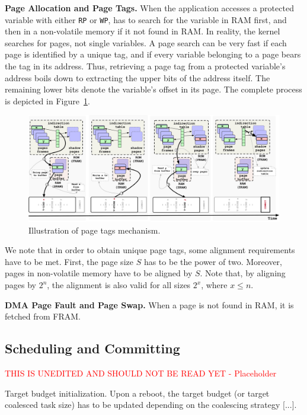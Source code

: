 \noindent \textbf{Page Allocation and Page Tags.} When the \sys application accesses a protected variable with either \texttt{RP} or \texttt{WP}, \sys has to search for the variable in RAM first, and then in a non-volatile memory if it not found in RAM. In reality, the \sys kernel searches for pages, not single variables. A page search can be very fast if each page is identified by a unique tag, and if every variable belonging to a page bears the tag in its address. Thus, retrieving a page tag from a protected variable's address boils down to extracting the upper bits of the address itself. The remaining lower bits denote the variable's offset in its page. The complete process is depicted in Figure~\ref{figure:coala_page_tags}.

\begin{figure}
	\centering
	\includegraphics[width=\textwidth]{figures/graffle/paging.pdf}
	\caption{Illustration of \sys page tags mechanism.}
	\label{figure:coala_page_tags}
\end{figure}

We note that in order to obtain unique page tags, some alignment requirements have to be met. First, the page size $S$ has to be the power of two. Moreover, pages in non-volatile memory have to be aligned by $S$. Note that, by aligning pages by $2^n$, the alignment is also valid for all sizes $2^x$, where $x \leq n$.

\noindent \textbf{DMA Page Fault and Page Swap.} When a page is not found in RAM, it is fetched from FRAM. 

\subsection{\sys Scheduling and Committing}

\textcolor{red}{THIS IS UNEDITED AND SHOULD NOT BE READ YET - Placeholder}

Target budget initialization. Upon a reboot, the target budget (or target coalesced task size) has to be updated depending on the coalescing strategy [...].

